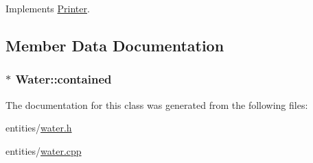 Implements \hyperlink{class_printer_a66ecfd99bb8bc0a88ed0fc1276c70e23}{Printer}.



\subsection{Member Data Documentation}
\hypertarget{class_water_a71b18a4a6cbd58ebbe7c927a84eaab3c}{
\subsubsection[{contained}]{$\ast$ Water\-::contained}}\label{class_water_a71b18a4a6cbd58ebbe7c927a84eaab3c}


The documentation for this class was generated from the following files\-:\begin{DoxyCompactItemize}
\item 
entities/\hyperlink{water_8h}{water.\-h}\item 
entities/\hyperlink{water_8cpp}{water.\-cpp}\end{DoxyCompactItemize}
